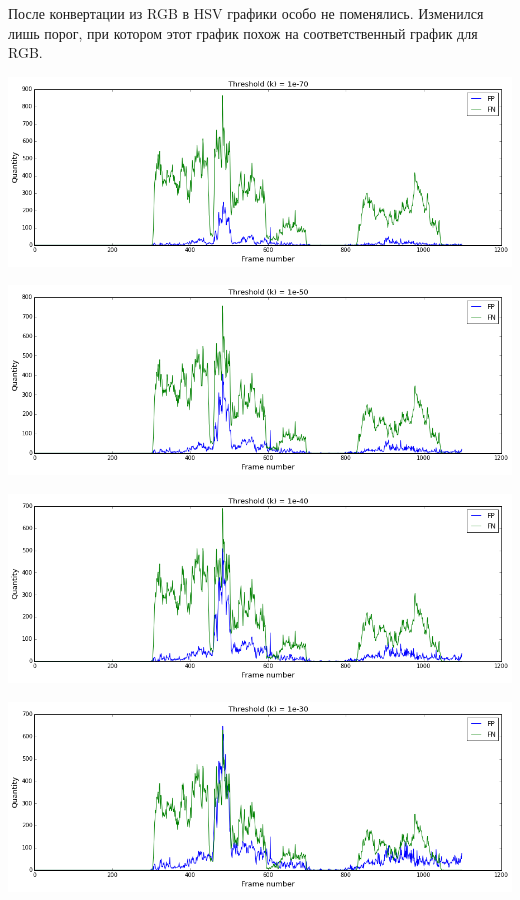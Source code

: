 \documentclass[12pt, a4paper]{article}
\begin{document}
			После конвертации из RGB в HSV графики особо не поменялись. Изменился лишь порог, при котором этот график похож на соответственный график для RGB.
			\begin{center}
				\includegraphics[width=17cm]{3_par_hsv_k_1e-70.png}
			\end{center}
			\begin{center}
				\includegraphics[width=17cm]{3_par_hsv_k_1e-50.png}
			\end{center}
			\begin{center}
				\includegraphics[width=17cm]{3_par_hsv_k_1e-40.png}
			\end{center}
			\begin{center}
				\includegraphics[width=17cm]{3_par_hsv_k_1e-30.png}
			\end{center}
\end{document}
